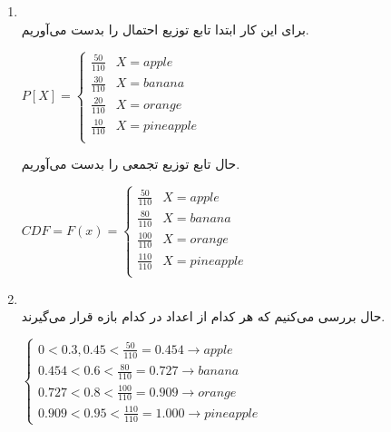 \begin{enumerate}
  \item \phantom{text}
        \\
        برای این کار ابتدا تابع توزیع احتمال را بدست می‌آوریم.\\
        \begin{latin}
          $P[X] = \begin{cases}
              \frac{50}{110} & X = apple     \\
              \frac{30}{110} & X = banana   \\
              \frac{20}{110} & X = orange    \\
              \frac{10}{110} & X = pineapple \\
            \end{cases}$
        \end{latin}
        حال تابع توزیع تجمعی را بدست می‌آوریم.
        \\
        \begin{latin}
          $
            CDF = F(x) = \begin{cases}
                \frac{50}{110} & X = apple \\
                \frac{80}{110} & X = banana \\
                \frac{100}{110} & X = orange \\
                \frac{110}{110} & X = pineapple \\
            \end{cases}
          $
        \end{latin}
      \item \phantom{text}
      \\
      حال بررسی می‌کنیم که هر کدام از اعداد در کدام بازه قرار می‌گیرند.\\
      \begin{latin}
        $\begin{cases}
          0 < 0.3,0.45 < \frac{50}{110} = 0.454 \rightarrow apple \\
          0.454 < 0.6 < \frac{80}{110} = 0.727 \rightarrow banana \\
          0.727 < 0.8 < \frac{100}{110} = 0.909 \rightarrow orange \\
          0.909 < 0.95 < \frac{110}{110} = 1.000 \rightarrow pineapple
        \end{cases}$
      \end{latin}
\end{enumerate}
